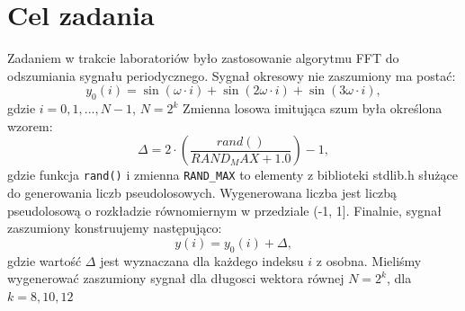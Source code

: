 \documentclass{article}
\begin{document}
\section{Cel zadania}

Zadaniem w trakcie laboratoriów było zastosowanie algorytmu FFT do odszumiania sygnału periodycznego. Sygnał okresowy nie zaszumiony ma postać:
\begin{equation}
y_0(i) = \sin(\omega \cdot i) +  \sin(2\omega \cdot i) +  \sin(3\omega \cdot i), 
\end{equation}
gdzie $i = 0, 1, . . . , N-1$, $N = 2^k$
\newline
Zmienna losowa imitująca szum była określona wzorem:
\begin{equation}
\Delta = 2 \cdot (\frac{rand()}{RAND_MAX + 1.0}) - 1,
\end{equation}
gdzie funkcja \texttt{rand()} i zmienna \texttt{RAND\_MAX} to elementy z biblioteki stdlib.h służące do generowania liczb pseudolosowych. Wygenerowana liczba jest liczbą pseudolosową o rozkładzie równomiernym w przedziale (-1, 1]. Finalnie, sygnał zaszumiony konstruujemy następująco:
\begin{equation}
y(i) = y_0(i) + \Delta,
\end{equation}
gdzie wartość $\Delta$ jest wyznaczana dla każdego indeksu $i$ z osobna.
\newline
Mieliśmy wygenerować zaszumiony sygnał dla długosci wektora równej $N=2^k$, dla $k=8,10,12$
\end{document}
